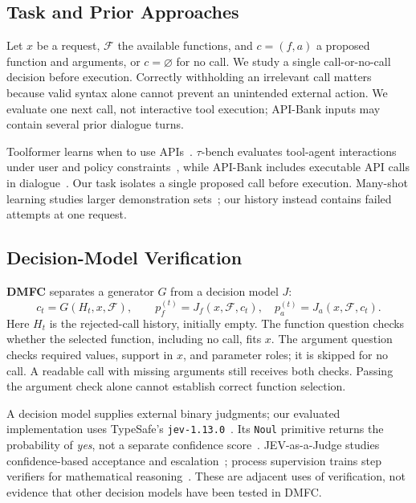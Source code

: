 \subsection{Task and Prior Approaches}
Let $x$ be a request, $\mathcal{F}$ the available functions, and $c=(f,a)$ a proposed function and arguments, or $c=\varnothing$ for no call. We study a single call-or-no-call decision before execution. Correctly withholding an irrelevant call matters because valid syntax alone cannot prevent an unintended external action. We evaluate one next call, not interactive tool execution; API-Bank inputs may contain several prior dialogue turns.

Toolformer learns when to use APIs~\cite{schick2023toolformer}. $\tau$-bench evaluates tool-agent interactions under user and policy constraints~\cite{yao2024taubench}, while API-Bank includes executable API calls in dialogue~\cite{li2023apibank}. Our task isolates a single proposed call before execution. Many-shot learning studies larger demonstration sets~\cite{agarwal2024manyshot}; our history instead contains failed attempts at one request.

\subsection{Decision-Model Verification}
\textbf{DMFC} separates a generator $G$ from a decision model $J$:
\begin{equation}
c_t=G(H_t,x,\mathcal{F}),\qquad
p_f^{(t)}=J_f(x,\mathcal{F},c_t),\quad
p_a^{(t)}=J_a(x,\mathcal{F},c_t).
\end{equation}
Here $H_t$ is the rejected-call history, initially empty. The function question checks whether the selected function, including no call, fits $x$. The argument question checks required values, support in $x$, and parameter roles; it is skipped for no call. A readable call with missing arguments still receives both checks. Passing the argument check alone cannot establish correct function selection.

A decision model supplies external binary judgments; our evaluated implementation uses TypeSafe's \texttt{jev-1.13.0}~\cite{typesafe2026models}. Its \texttt{Noul} primitive returns the probability of \emph{yes}, not a separate confidence score~\cite{typesafe2026noul,typesafe2026confidence}. JEV-as-a-Judge studies confidence-based acceptance and escalation~\cite{li2026jevjudge}; process supervision trains step verifiers for mathematical reasoning~\cite{lightman2023verify}. These are adjacent uses of verification, not evidence that other decision models have been tested in DMFC.


